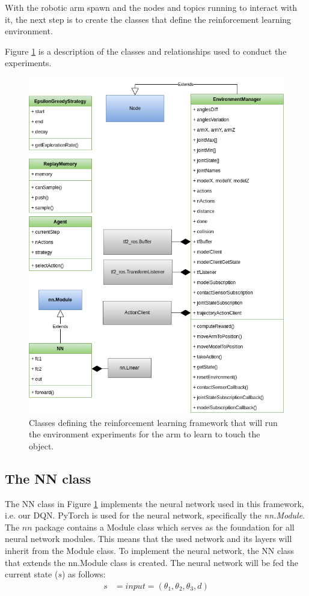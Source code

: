 \documentclass[12pt,oneside]{article}
\begin{document}
With the robotic arm spawn and the nodes and topics running to interact with it, the next step is to create the classes that define the reinforcement learning environment.

Figure \ref{fig:classdiagramcomplete} is a description of the classes and relationships used to conduct the experiments.

\begin{figure}[H]
\centering
\includegraphics[width=0.95\linewidth]{uml_diagram_complete}
\caption[Classes and relationships in the reinforcement learning framework.]{Classes defining the reinforcement learning framework that will run the environment experiments for the arm to learn to touch the object.}
\label{fig:classdiagramcomplete}
\end{figure}

\subsection{The NN class}      
The NN class in Figure \ref{fig:classdiagramcomplete} implements the neural network used in this framework, i.e. our DQN.         
PyTorch \cite{pytorch} is used for the neural network, specifically the \textit{nn.Module}. 
The $nn$ package contains a Module class which serves as the foundation for all neural network modules. This means that the used network and its layers will inherit from the Module class. To implement the neural network, the NN class that extends the nn.Module class is created. The neural network will be fed the current state ($s$) as follows:
\begin{align}
		s &= input = (\theta_1, \theta_2, \theta_3, d) \label{eq:1}
\end{align}
\end{document}
